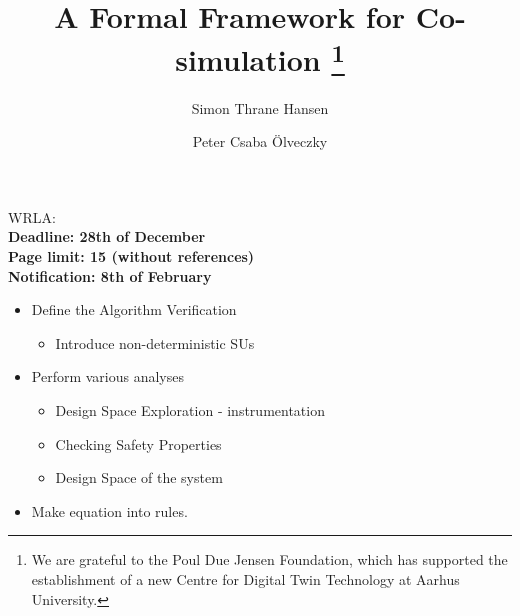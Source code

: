 \documentclass[runningheads]{llncs}
\begin{document}
\title{A Formal Framework for Co-simulation
\thanks{We are grateful to the Poul Due Jensen Foundation, which has supported the establishment of a new Centre for Digital Twin Technology at Aarhus University.}}

\author{Simon Thrane Hansen  
\and Peter Csaba Ölveczky  }
%


%
\institute{
  DIGIT, Department of Electrical and Computer Engineering, Aarhus University, Aarhus, Denmark, \\
  \and Department of Informatics, Oslo University, Oslo Norway \\
}

\maketitle              %

WRLA:\\
\textbf{Deadline: 28th of December}
\\
\textbf{Page limit: 15 (without references)}\\
\textbf{Notification: 8th of February}


\begin{itemize}
  \item Define the Algorithm Verification
  \begin{itemize}
    \item Introduce non-deterministic SUs
  \end{itemize}
  \item Perform various analyses
  \begin{itemize}
    \item Design Space Exploration - instrumentation
    \item Checking Safety Properties
    \item Design Space of the system
  \end{itemize}
  \item Make equation into rules.
\end{itemize}
\end{document}
